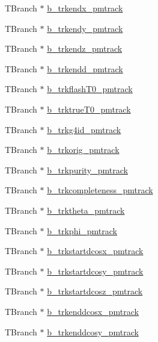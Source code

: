 \begin{DoxyCompactItemize}
\item 
T\-Branch $\ast$ \hyperlink{classanatree_ad2fc7561e9a2e3863a7d62a8b7525f39}{b\-\_\-trkendx\-\_\-pmtrack}
\item 
T\-Branch $\ast$ \hyperlink{classanatree_a3300720e9ea9e8ca3e7b648caf2b1114}{b\-\_\-trkendy\-\_\-pmtrack}
\item 
T\-Branch $\ast$ \hyperlink{classanatree_a8987b8eed2e0f9ac5dccee1eee8507a5}{b\-\_\-trkendz\-\_\-pmtrack}
\item 
T\-Branch $\ast$ \hyperlink{classanatree_a601a500778c2722c487fd097a326e53c}{b\-\_\-trkendd\-\_\-pmtrack}
\item 
T\-Branch $\ast$ \hyperlink{classanatree_a76df837d69832b19d63e7d8de1083f87}{b\-\_\-trkflash\-T0\-\_\-pmtrack}
\item 
T\-Branch $\ast$ \hyperlink{classanatree_a34c8d5f821ce93c2e0859ecec72b6484}{b\-\_\-trktrue\-T0\-\_\-pmtrack}
\item 
T\-Branch $\ast$ \hyperlink{classanatree_a00dcbd3c1b7f5292070196712c827f31}{b\-\_\-trkg4id\-\_\-pmtrack}
\item 
T\-Branch $\ast$ \hyperlink{classanatree_a899eb69e6decc594b6b2f9f0e99cabc6}{b\-\_\-trkorig\-\_\-pmtrack}
\item 
T\-Branch $\ast$ \hyperlink{classanatree_ab760353df144ef75e96fe6b08f61d407}{b\-\_\-trkpurity\-\_\-pmtrack}
\item 
T\-Branch $\ast$ \hyperlink{classanatree_a9311a2e8106df4e646f1e03832b8e2b2}{b\-\_\-trkcompleteness\-\_\-pmtrack}
\item 
T\-Branch $\ast$ \hyperlink{classanatree_a1de5332e834fd99b4b979531a783a0b7}{b\-\_\-trktheta\-\_\-pmtrack}
\item 
T\-Branch $\ast$ \hyperlink{classanatree_a597bd5a7432cb07f07aab4c5b8f7748d}{b\-\_\-trkphi\-\_\-pmtrack}
\item 
T\-Branch $\ast$ \hyperlink{classanatree_aa04ac1fdf4ec30016627e53978ae692e}{b\-\_\-trkstartdcosx\-\_\-pmtrack}
\item 
T\-Branch $\ast$ \hyperlink{classanatree_afb38adb7fc5053eb4e3e324123a1351e}{b\-\_\-trkstartdcosy\-\_\-pmtrack}
\item 
T\-Branch $\ast$ \hyperlink{classanatree_a827ce566874562399b3222d966adbb21}{b\-\_\-trkstartdcosz\-\_\-pmtrack}
\item 
T\-Branch $\ast$ \hyperlink{classanatree_a066e97c989f79e437f2ffd1769c48296}{b\-\_\-trkenddcosx\-\_\-pmtrack}
\item 
T\-Branch $\ast$ \hyperlink{classanatree_abdb7f155ee425a630176bfa61c1774dc}{b\-\_\-trkenddcosy\-\_\-pmtrack}

\end{DoxyCompactItemize}
